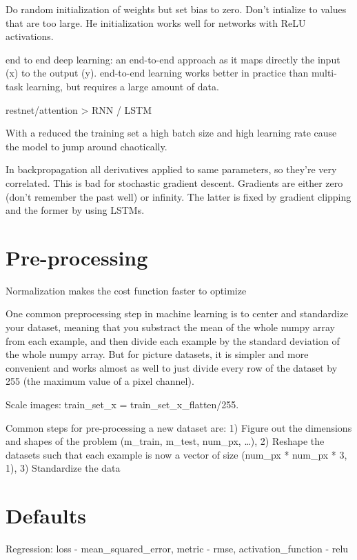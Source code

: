 \documentclass[]{book}
\begin{document}
Do random initialization of weights but set bias to zero. Don't
intialize to values that are too large. He initialization works well for
networks with ReLU activations.

end to end deep learning: an end-to-end approach as it maps directly the
input (x) to the output (y). end-to-end learning works better in
practice than multi-task learning, but requires a large amount of data.

restnet/attention \textgreater{} RNN / LSTM

With a reduced the training set a high batch size and high learning rate
cause the model to jump around chaotically.

In backpropagation all derivatives applied to same parameters, so
they're very correlated. This is bad for stochastic gradient descent.
Gradients are either zero (don't remember the past well) or infinity.
The latter is fixed by gradient clipping and the former by using LSTMs.

\section{Pre-processing}\label{pre-processing-1}

Normalization makes the cost function faster to optimize

One common preprocessing step in machine learning is to center and
standardize your dataset, meaning that you substract the mean of the
whole numpy array from each example, and then divide each example by the
standard deviation of the whole numpy array. But for picture datasets,
it is simpler and more convenient and works almost as well to just
divide every row of the dataset by 255 (the maximum value of a pixel
channel).

Scale images: train\_set\_x = train\_set\_x\_flatten/255.

Common steps for pre-processing a new dataset are: 1) Figure out the
dimensions and shapes of the problem (m\_train, m\_test, num\_px,
\ldots{}), 2) Reshape the datasets such that each example is now a
vector of size (num\_px * num\_px * 3, 1), 3) Standardize the data

\section{Defaults}\label{defaults}

Regression: loss - mean\_squared\_error, metric - rmse,
activation\_function - relu
\end{document}
